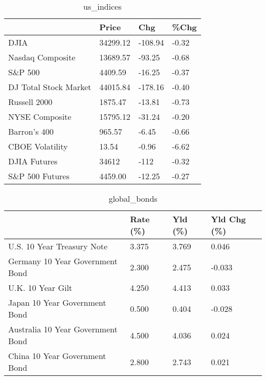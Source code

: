 \documentclass{article}%
\begin{document}
%


\begin{table}[htbp]%
\caption{us\_indices}%
\centering%
\begin{adjustbox}{width=1\textwidth}%
\begin{tabular}{llll}
\toprule
                      &    Price &     Chg &  \%Chg \\
\midrule
                 DJIA & 34299.12 & -108.94 & -0.32 \\
     Nasdaq Composite & 13689.57 &  -93.25 & -0.68 \\
              S\&P 500 &  4409.59 &  -16.25 & -0.37 \\
DJ Total Stock Market & 44015.84 & -178.16 & -0.40 \\
         Russell 2000 &  1875.47 &  -13.81 & -0.73 \\
       NYSE Composite & 15795.12 &  -31.24 & -0.20 \\
         Barron's 400 &   965.57 &   -6.45 & -0.66 \\
      CBOE Volatility &    13.54 &   -0.96 & -6.62 \\
         DJIA Futures &    34612 &    -112 & -0.32 \\
      S\&P 500 Futures &  4459.00 &  -12.25 & -0.27 \\
\bottomrule
\end{tabular}
%
\end{adjustbox}%
\end{table}

%


\begin{table}[htbp]%
\caption{global\_bonds}%
\centering%
\begin{adjustbox}{width=1\textwidth}%
\begin{tabular}{llll}
\toprule
                                  & Rate (\%) & Yld (\%) & Yld Chg (\%) \\
\midrule
       U.S. 10 Year Treasury Note &    3.375 &   3.769 &       0.046 \\
  Germany 10 Year Government Bond &    2.300 &   2.475 &      -0.033 \\
                U.K. 10 Year Gilt &    4.250 &   4.413 &       0.033 \\
    Japan 10 Year Government Bond &    0.500 &   0.404 &      -0.028 \\
Australia 10 Year Government Bond &    4.500 &   4.036 &       0.024 \\
    China 10 Year Government Bond &    2.800 &   2.743 &       0.021 \\
\bottomrule
\end{tabular}
%
\end{adjustbox}%
\end{table}
\end{document}
